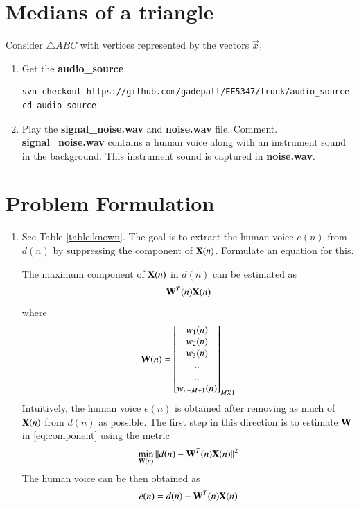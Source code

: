 \documentclass[journal,12pt,twocolumn]{IEEEtran}
\renewcommand\thesection{\arabic{section}}
\begin{document}
\section{Medians of a triangle}
Consider  $\triangle ABC$ with vertices represented by the vectors $\vec{x}_1$
\begin{enumerate}[label=\thesection.\arabic*
,ref=\thesection.\theenumi]
\item Get the \textbf{audio\_source}
\begin{lstlisting}
svn checkout https://github.com/gadepall/EE5347/trunk/audio_source
cd audio_source
\end{lstlisting}
\item Play the \textbf{signal\_noise.wav} and \textbf{noise.wav} file. Comment.
\\
\solution
\textbf{signal\_noise.wav}  contains a human voice along 
with an instrument sound in the background.  This instrument sound
is captured in \textbf{noise.wav}.
\end{enumerate}
%
\section{Problem Formulation}
\begin{enumerate}[label=\thesection.\arabic*
,ref=\thesection.\theenumi]

\item See Table \ref{table:known}.  The goal is to extract the human voice $e(n)$ from $d(n)$ by suppressing the component of $\mathbf{X}(n)$.  Formulate 
an equation for this.
\begin{table}[!ht]
\centering
\small

\caption{}
\label{table:known}
\end{table}
%
\solution The  maximum component of $\mathbf{X}(n)$ in $d(n)$ can be estimated as
%
\begin{equation}
\label{eq:component}
\mathbf{W}^{T}(n)\mathbf{X}(n)
\end{equation}
where 
\begin{align}
 \mbf{W}(n)
 =
  \begin{bmatrix}
   w_1(n) \\ w_2(n)\\
   w_3(n) \\ $..$ \\ $..$ \\ w_{n-M+1}(n)  \end{bmatrix}_{M X 1}
\end{align}
%
Intuitively, the human voice $e(n)$ is obtained after removing as much of $\mathbf{X}(n)$ from $d(n)$ as 
possible. The first step in this direction is to estimate $\mathbf{W}$ in \eqref{eq:component} using the metric
\begin{equation}
\label{eq:prob_mse}
\min_{\mathbf{W}(n)}\, \lVert d(n)-\mathbf{W}^{T}(n)\mathbf{X}(n)\rVert^2
\end{equation}
%
The human voice can be then obtained as
%
\begin{align}
\label{eq:error}
e(n) = d(n)-\mathbf{W}^{T}(n)\mathbf{X}(n)
\end{align}
%
%
\end{enumerate}
\end{document}

